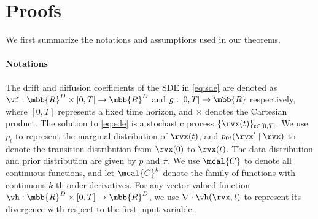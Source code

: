 \section{Proofs}\label{app:proof}
We first summarize the notations and assumptions used in our theorems.
\paragraph{Notations} 
The drift and diffusion coefficients of the SDE in \cref{eq:sde} are denoted as $\vf: \mbb{R}^D \times [0,T] \to \mbb{R}^D$ and $g: [0, T] \to \mbb{R}$ respectively, where $[0, T]$ represents a fixed time horizon, and $\times$ denotes the Cartesian product. The solution to \cref{eq:sde} is a stochastic process $\{\rvx(t) \}_{t\in[0, T]}$. We use $p_t$ to represent the marginal distribution of $\rvx(t)$, and $p_{0t}(\rvx' \mid \rvx)$ to denote the transition distribution from $\rvx(0)$ to $\rvx(t)$. The data distribution and prior distribution are given by $p$ and $\pi$. We use $\mcal{C}$ to denote all continuous functions, and let $\mcal{C}^k$ denote the family of functions with continuous $k$-th order derivatives. For any vector-valued function $\vh: \mbb{R}^D \times [0,T] \to \mbb{R}^D$, we use $\nabla \cdot \vh(\rvx, t)$ to represent its divergence with respect to the first input variable.
